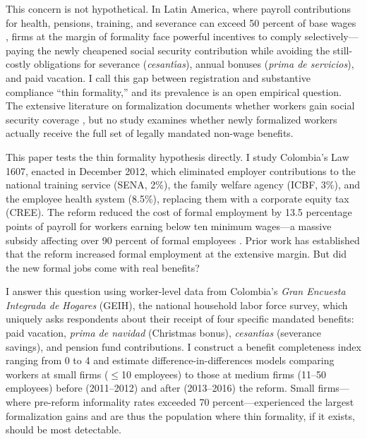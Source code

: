\documentclass[12pt]{article}
\begin{document}
This concern is not hypothetical. In Latin America, where payroll contributions for health, pensions, training, and severance can exceed 50 percent of base wages \citep{heckman2000effects}, firms at the margin of formality face powerful incentives to comply selectively---paying the newly cheapened social security contribution while avoiding the still-costly obligations for severance (\textit{cesant\'{\i}as}), annual bonuses (\textit{prima de servicios}), and paid vacation. I call this gap between registration and substantive compliance ``thin formality,'' and its prevalence is an open empirical question. The extensive literature on formalization documents whether workers gain social security coverage \citep{kugler2017effects, morales2017effect, almeida2012enforcement, kumler2020enlisting}, but no study examines whether newly formalized workers actually receive the full set of legally mandated non-wage benefits.

This paper tests the thin formality hypothesis directly. I study Colombia's Law 1607, enacted in December 2012, which eliminated employer contributions to the national training service (SENA, 2\%), the family welfare agency (ICBF, 3\%), and the employee health system (8.5\%), replacing them with a corporate equity tax (CREE). The reform reduced the cost of formal employment by 13.5 percentage points of payroll for workers earning below ten minimum wages---a massive subsidy affecting over 90 percent of formal employees \citep{kugler2017effects, bernal2017payroll}. Prior work has established that the reform increased formal employment at the extensive margin. But did the new formal jobs come with real benefits?

I answer this question using worker-level data from Colombia's \textit{Gran Encuesta Integrada de Hogares} (GEIH), the national household labor force survey, which uniquely asks respondents about their receipt of four specific mandated benefits: paid vacation, \textit{prima de navidad} (Christmas bonus), \textit{cesant\'{\i}as} (severance savings), and pension fund contributions. I construct a benefit completeness index ranging from 0 to 4 and estimate difference-in-differences models comparing workers at small firms ($\leq$10 employees) to those at medium firms (11--50 employees) before (2011--2012) and after (2013--2016) the reform. Small firms---where pre-reform informality rates exceeded 70 percent---experienced the largest formalization gains and are thus the population where thin formality, if it exists, should be most detectable.
\end{document}
